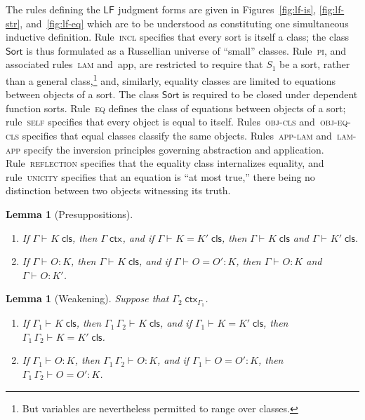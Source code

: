 \documentclass[11pt,twoside]{article}
\newtheorem{lemma}[theorem]{Lemma}
\newcommand{\LF}[1][]{\ensuremath{\mathsf{LF}_{#1}}}
\newcommand{\sortclass}{\ensuremath{\textsf{Sort}}}
\newcommand{\appctx}[2]{{#1}\,{#2}}
\newcommand{\isctx}[2][]{{#2}\;\mathsf{ctx}_{#1}}
\newcommand{\iscls}[3][]{{#2}\vdash_{#1}{#3}\;\mathsf{cls}}
\newcommand{\eqcls}[4][]{{#2}\vdash_{#1}{#3}={#4}\;\mathsf{cls}}
\newcommand{\isobj}[4][]{{#2}\vdash_{#1}{#3}:{#4}}
\newcommand{\eqobj}[5][]{{#2}\vdash_{#1}{#3}={#4}:{#5}}
\begin{document}
The rules defining the \LF{} judgment forms are given in Figures~\ref{fig:lf-is},
\ref{fig:lf-str}, and~\ref{fig:lf-eq} which are to be understood as constituting one
simultaneous inductive definition.  Rule~\textsc{incl} specifies that every sort is itself
a class; the class $\sortclass$ is thus formulated as a Russellian universe of ``small''
classes.  Rule~\textsc{pi}, and associated rules~\textsc{lam} and~\textsf{app}, are
restricted to require that $S_{1}$ be a sort, rather than a general class,\footnote{But
  variables are nevertheless permitted to range over classes.}  and, similarly, equality
classes are limited to equations between objects of a sort.  The class \sortclass{} is
required to be closed under dependent function sorts.  Rule~\textsc{eq} defines the class
of equations between objects of a sort; rule~\textsc{self} specifies that every object is
equal to itself.  Rules~\textsc{obj-cls} and~\textsc{obj-eq-cls} specifies that equal
classes classify the same objects.  Rules~\textsc{app-lam} and~\textsc{lam-app} specify
the inversion principles governing abstraction and application.  Rule~\textsc{reflection}
specifies that the equality class internalizes equality, and rule~\textsc{unicity}
specifies that an equation is ``at most true,'' there being no distinction between two
objects witnessing its truth.

\begin{lemma}[Presuppositions]
  \label{lemma:presup}
  \begin{enumerate}
  \item If\/ $\iscls{\Gamma}{K}$, then $\isctx{\Gamma}$, and if\/ $\eqcls{\Gamma}{K}{K'}$, then $\iscls{\Gamma}{K}$
    and $\iscls{\Gamma}{K'}$.
  \item If\/ $\isobj{\Gamma}{O}{K}$, then $\iscls{\Gamma}{K}$, and if\/ $\eqobj{\Gamma}{O}{O'}{K}$, then
    $\isobj{\Gamma}{O}{K}$ and $\isobj{\Gamma}{O}{K'}$.
  \end{enumerate}
\end{lemma}

\begin{lemma}[Weakening]
  \label{lemma:weak}
  Suppose that $\isctx[\Gamma_1]{\Gamma_2}$.
  \begin{enumerate}
  \item If\/ $\iscls{\Gamma_1}{K}$, then $\iscls{\appctx{\Gamma_{1}}{\Gamma_2}}{K}$, and if\/
    $\eqcls{\Gamma_1}{K}{K'}$, then $\eqcls{\appctx{\Gamma_1}{\Gamma_2}}{K}{K'}$.
  \item If\/ $\isobj{\Gamma_1}{O}{K}$, then $\isobj{\appctx{\Gamma_1}{\Gamma_2}}{O}{K}$, and if\/
    $\eqobj{\Gamma_1}{O}{O'}{K}$, then $\eqobj{\appctx{\Gamma_1}{\Gamma_2}}{O}{O'}{K}$.
  \end{enumerate}
\end{lemma}
\end{document}
